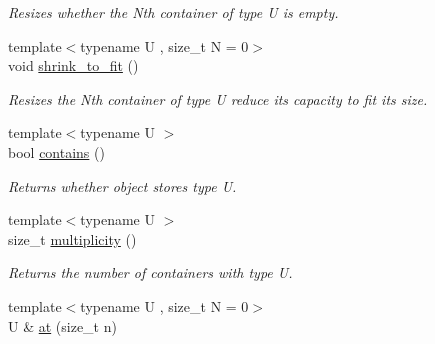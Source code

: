 \begin{DoxyCompactItemize}
\begin{DoxyCompactList}\small\item\em Resizes whether the Nth container of type U is empty. \end{DoxyCompactList}\item 
\hypertarget{classheterogeneous_1_1heterodeque_3_01_t_00_01_types_8_8_8_4_abf67a45629efcf65fa0784f214ef6061}{}{\footnotesize template$<$typename U , size\+\_\+t N = 0$>$ }\\void \hyperlink{classheterogeneous_1_1heterodeque_3_01_t_00_01_types_8_8_8_4_abf67a45629efcf65fa0784f214ef6061}{shrink\+\_\+to\+\_\+fit} ()\label{classheterogeneous_1_1heterodeque_3_01_t_00_01_types_8_8_8_4_abf67a45629efcf65fa0784f214ef6061}

\begin{DoxyCompactList}\small\item\em Resizes the Nth container of type U reduce its capacity to fit its size. \end{DoxyCompactList}\item 
\hypertarget{classheterogeneous_1_1heterodeque_3_01_t_00_01_types_8_8_8_4_a7e876428e3c61d8dd88c6a5e45f8fe06}{}{\footnotesize template$<$typename U $>$ }\\bool \hyperlink{classheterogeneous_1_1heterodeque_3_01_t_00_01_types_8_8_8_4_a7e876428e3c61d8dd88c6a5e45f8fe06}{contains} ()\label{classheterogeneous_1_1heterodeque_3_01_t_00_01_types_8_8_8_4_a7e876428e3c61d8dd88c6a5e45f8fe06}

\begin{DoxyCompactList}\small\item\em Returns whether object stores type U. \end{DoxyCompactList}\item 
\hypertarget{classheterogeneous_1_1heterodeque_3_01_t_00_01_types_8_8_8_4_a8531373eee7ac52ed2e0f24d46c96ffd}{}{\footnotesize template$<$typename U $>$ }\\size\+\_\+t \hyperlink{classheterogeneous_1_1heterodeque_3_01_t_00_01_types_8_8_8_4_a8531373eee7ac52ed2e0f24d46c96ffd}{multiplicity} ()\label{classheterogeneous_1_1heterodeque_3_01_t_00_01_types_8_8_8_4_a8531373eee7ac52ed2e0f24d46c96ffd}

\begin{DoxyCompactList}\small\item\em Returns the number of containers with type U. \end{DoxyCompactList}\item 
\hypertarget{classheterogeneous_1_1heterodeque_3_01_t_00_01_types_8_8_8_4_a9e7656a276605e21ede3c5a28bda4432}{}{\footnotesize template$<$typename U , size\+\_\+t N = 0$>$ }\\U \& \hyperlink{classheterogeneous_1_1heterodeque_3_01_t_00_01_types_8_8_8_4_a9e7656a276605e21ede3c5a28bda4432}{at} (size\+\_\+t n)\label{classheterogeneous_1_1heterodeque_3_01_t_00_01_types_8_8_8_4_a9e7656a276605e21ede3c5a28bda4432}


\end{DoxyCompactItemize}
